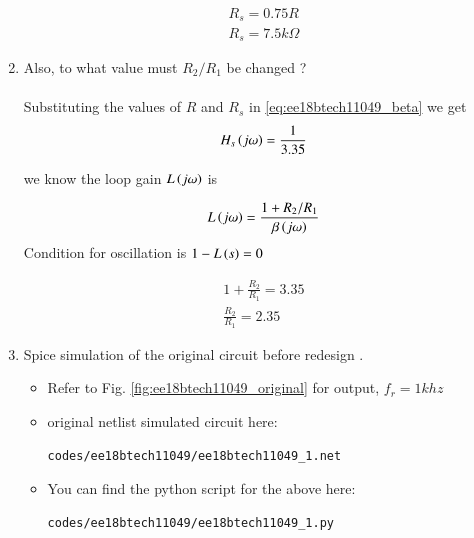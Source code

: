 \begin{enumerate}[label=\arabic*.,ref=\theenumi]
\begin{align}
   R_s = 0.75R \\
   R_s = 7.5k\Omega 
\end{align}


\item Also, to what value must $R_2/R_1$ be changed ?
\\
\\
\solution Substituting the values of $R $ and $ R_s$ in \ref{eq:ee18btech11049_beta} we get
\begin{align}
    H_s\left(j\omega\right) = \frac{1}{3.35}
\end{align}
%

we know the loop gain $L\left(j\omega\right)$ is


\begin{align}
    L\left(j\omega\right) = \frac{1+R_2/R_1}{\beta \left(j\omega\right)}
\end{align}
Condition for oscillation is $1-L\left(s\right) = 0$

\begin{align}
    1 + \frac{R_2}{R_1} = 3.35 \\
    \frac{R_2}{R_1} = 2.35
\end{align}


\item Spice simulation of the original circuit before redesign . 
\\

\solution 

\begin{itemize}
\item Refer to Fig. \ref{fig:ee18btech11049_original}
 for output, $f_r = 1 khz $
\item original netlist simulated circuit here:
\begin{lstlisting}
codes/ee18btech11049/ee18btech11049_1.net
\end{lstlisting}
\item You can find the python script for the above here:
\begin{lstlisting}
codes/ee18btech11049/ee18btech11049_1.py
\end{lstlisting}
\end{itemize}


\end{enumerate}

